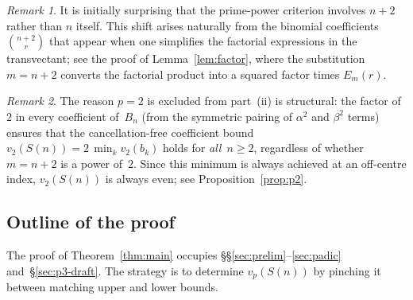 \documentclass[10pt]{amsart}
\theoremstyle{definition}
\theoremstyle{remark}
\newtheorem*{remark}{Remark}
\begin{document}
\begin{remark}
It is initially surprising that the prime-power criterion involves $n+2$
rather than $n$ itself.  This shift arises naturally from the binomial
coefficients $\binom{n+2}{r}$ that appear when one simplifies the factorial
expressions in the transvectant; see the proof of Lemma~\ref{lem:factor},
where the substitution $m = n+2$ converts the factorial product into a
squared factor times $E_m(r)$.
\end{remark}

\begin{remark}
The reason $p=2$ is excluded from part~(ii) is structural:
the factor of~$2$ in every coefficient of~$B_n$ (from the
symmetric pairing of $\alpha^2$ and $\beta^2$ terms) ensures that
the cancellation-free coefficient bound
$v_2(S(n)) = 2\,\min_k v_2(b_k)$ holds for \emph{all}~$n \ge 2$,
regardless of whether $m = n+2$ is a power of~$2$.
Since this minimum is always achieved at an off-centre index,
$v_2(S(n))$ is always even; see Proposition~\ref{prop:p2}.
\end{remark}

\subsection{Outline of the proof}

The proof of Theorem~\ref{thm:main} occupies
\S\S\ref{sec:prelim}--\ref{sec:padic} and~\S\ref{sec:p3-draft}.
The strategy is to determine $v_p(S(n))$ by pinching it between
matching upper and lower bounds.
\end{document}
